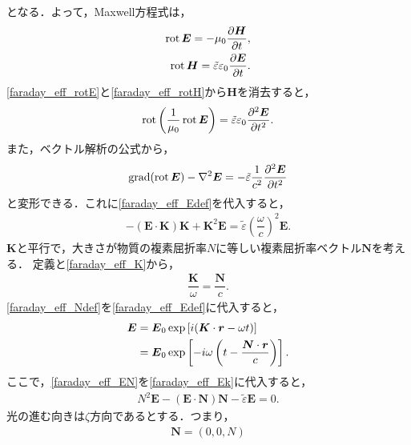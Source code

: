 となる．よって，Maxwell方程式は，
\begin{align}
  \operatorname{rot} \boldsymbol{E}= - \mu_0\dfrac{\partial\boldsymbol{H}}{\partial{t}} , \label{faraday_eff_rotE} \\
  \operatorname{rot} \boldsymbol{H}=\tilde{\varepsilon}\varepsilon_0\dfrac{\partial\boldsymbol{E}}{\partial{t}} . \label{faraday_eff_rotH}
\end{align}
\eqref{faraday_eff_rotE}と\eqref{faraday_eff_rotH}から$\boldsymbol{H}$を消去すると，
\begin{align}
  \operatorname{rot} \left(\dfrac{1}{\mu_0}\operatorname{rot} \boldsymbol{E}\right)=\tilde{\varepsilon}\varepsilon_0\dfrac{\partial^2\boldsymbol{E}}{\partial t^2} .
\end{align}
また，ベクトル解析の公式から，
\begin{align}
  \operatorname{grad}(\operatorname{rot} \boldsymbol{E}) - {\nabla}^2\boldsymbol{E}= - \tilde{\varepsilon}\dfrac{1}{c^2}\dfrac{\partial^2\boldsymbol{E}}{\partial t^2}
\end{align}
と変形できる．これに\eqref{faraday_eff_Edef}を代入すると，
\begin{align}
  - (\boldsymbol{E}\cdot\boldsymbol{K})\boldsymbol{K}+\boldsymbol{K}^2\boldsymbol{E}=\tilde{\varepsilon}\left(\dfrac{\omega}{c}\right)^2\boldsymbol{E} .  \label{faraday_eff_Ek}
\end{align}
$\boldsymbol{K}$と平行で，大きさが物質の複素屈折率$N$に等しい複素屈折率ベクトル$\boldsymbol{N}$を考える．
定義と\eqref{faraday_eff_K}から，
\begin{align}
  \dfrac{\boldsymbol{K}}{\omega}=\dfrac{\boldsymbol{N}}{c} . \label{faraday_eff_Ndef}
\end{align}
\eqref{faraday_eff_Ndef}を\eqref{faraday_eff_Edef}に代入すると，
\begin{align}
  \boldsymbol{E} &= \boldsymbol{E}_0\exp\left[i(\boldsymbol{K}\cdot\boldsymbol{r} - \omega{t})\right] \notag \\
  &= \boldsymbol{E}_0\exp\left[ - i\omega\left(t - \dfrac{\boldsymbol{N}\cdot\boldsymbol{r}}{c}\right)\right] . \label{faraday_eff_EN}
\end{align}
ここで，\eqref{faraday_eff_EN}を\eqref{faraday_eff_Ek}に代入すると，
\begin{align}
  N^2\boldsymbol{E} - (\boldsymbol{E}\cdot\boldsymbol{N})\boldsymbol{N} - \tilde{\varepsilon}\boldsymbol{E}=0 . \label{faraday_eff_NE}
\end{align}
光の進む向きは$\zeta$方向であるとする．つまり，
\begin{align}
  \boldsymbol{N}=(0,0,N) \label{faraday_eff_Nvec}
\end{align}
